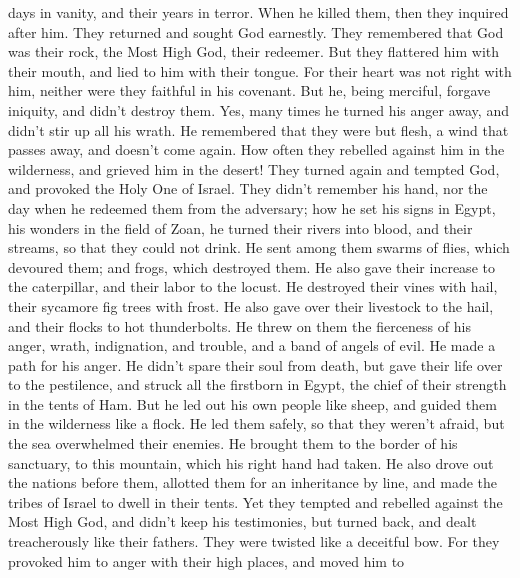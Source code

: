 days in vanity, and their years in terror.  When he killed
them, then they inquired after him. They returned and sought God
earnestly.  They remembered that God was their rock, the
Most High God, their redeemer.  But they flattered him with
their mouth, and lied to him with their tongue.  For their
heart was not right with him, neither were they faithful in his
covenant.  But he, being merciful, forgave iniquity, and
didn't destroy them. Yes, many times he turned his anger away, and
didn't stir up all his wrath.  He remembered that they were
but flesh, a wind that passes away, and doesn't come again.
 How often they rebelled against him in the wilderness, and
grieved him in the desert!  They turned again and tempted
God, and provoked the Holy One of Israel.  They didn't
remember his hand, nor the day when he redeemed them from the adversary;
 how he set his signs in Egypt, his wonders in the field of
Zoan,  he turned their rivers into blood, and their
streams, so that they could not drink.  He sent among them
swarms of flies, which devoured them; and frogs, which destroyed them.
 He also gave their increase to the caterpillar, and their
labor to the locust.  He destroyed their vines with hail,
their sycamore fig trees with frost.  He also gave over
their livestock to the hail, and their flocks to hot thunderbolts.
 He threw on them the fierceness of his anger, wrath,
indignation, and trouble, and a band of angels of evil.  He
made a path for his anger. He didn't spare their soul from death, but
gave their life over to the pestilence,  and struck all the
firstborn in Egypt, the chief of their strength in the tents of Ham.
 But he led out his own people like sheep, and guided them
in the wilderness like a flock.  He led them safely, so
that they weren't afraid, but the sea overwhelmed their enemies.
 He brought them to the border of his sanctuary, to this
mountain, which his right hand had taken.  He also drove
out the nations before them, allotted them for an inheritance by line,
and made the tribes of Israel to dwell in their tents.  Yet
they tempted and rebelled against the Most High God, and didn't keep his
testimonies,  but turned back, and dealt treacherously like
their fathers. They were twisted like a deceitful bow.  For
they provoked him to anger with their high places, and moved him to
